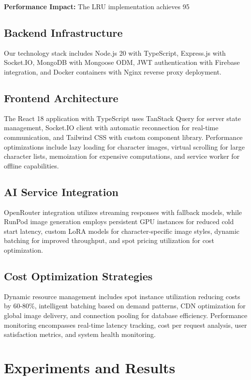\documentclass[conference]{IEEEtran}
\begin{document}
\textbf{Performance Impact:} The LRU implementation achieves 95%

\subsection{Backend Infrastructure}
Our technology stack includes Node.js 20 with TypeScript, Express.js with Socket.IO, MongoDB with Mongoose ODM, JWT authentication with Firebase integration, and Docker containers with Nginx reverse proxy deployment.

\subsection{Frontend Architecture}
The React 18 application with TypeScript uses TanStack Query for server state management, Socket.IO client with automatic reconnection for real-time communication, and Tailwind CSS with custom component library. Performance optimizations include lazy loading for character images, virtual scrolling for large character lists, memoization for expensive computations, and service worker for offline capabilities.

\subsection{AI Service Integration}
OpenRouter integration utilizes streaming responses with fallback models, while RunPod image generation employs persistent GPU instances for reduced cold start latency, custom LoRA models for character-specific image styles, dynamic batching for improved throughput, and spot pricing utilization for cost optimization.

\subsection{Cost Optimization Strategies}
Dynamic resource management includes spot instance utilization reducing costs by 60-80\%, intelligent batching based on demand patterns, CDN optimization for global image delivery, and connection pooling for database efficiency. Performance monitoring encompasses real-time latency tracking, cost per request analysis, user satisfaction metrics, and system health monitoring.

\section{Experiments and Results}
\end{document}
